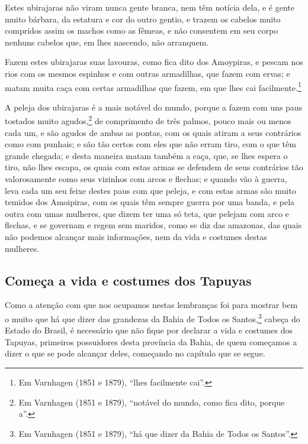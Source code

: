 Estes ubirajaras não viram nunca gente branca, nem têm notícia dela, e é gente muito
bárbara, da estatura e cor do outro gentio, e trazem os cabelos muito compridos assim os
machos como as fêmeas, e não consentem em seu corpo nenhuns cabelos que, em lhes nascendo,
não arranquem.

Fazem estes ubirajaras suas lavouras, como fica dito dos Amoypiras, e pescam nos rios com
os mesmos espinhos e com outras armadilhas, que fazem com ervas; e matam muita caça com
certas armadilhas que fazem, em que lhes cai facilmente.\footnote{ Em Varnhagen (1851 e
1879), ``lhes facilmente cai''.}

A peleja dos ubirajaras é a mais notável do mundo, porque a fazem com uns paus tostados
muito agudos,\footnote{ Em Varnhagen (1851 e 1879), ``notável do mundo, como fica dito,
porque a''.} de comprimento de três palmos, pouco mais ou menos cada um, e são agudos de
ambas as pontas, com os quais atiram a seus contrários como com punhais; e são tão certos
com eles que não erram tiro, com o que têm grande chegada; e desta maneira matam também a
caça, que, se lhes espera o tiro, não lhes escapa, os quais com estas armas se defendem de
seus contrários tão valorosamente como seus vizinhos com arcos e flechas; e quando vão à
guerra, leva cada um seu feixe destes paus com que peleja, e com estas armas são muito
temidos dos Amoipiras, com os quais têm sempre guerra por uma banda, e pela outra com umas
mulheres, que dizem ter uma só teta, que pelejam com arco e flechas, e se governam e regem
sem maridos, como se diz das amazonas, das quais não podemos alcançar mais informações,
nem da vida e costumes destas mulheres.

\subsection{Começa a vida e costumes dos Tapuyas}

Como a atenção com que nos ocupamos nestas lembranças foi para mostrar bem o muito que há
que dizer das grandezas da Bahia de Todos os Santos,\footnote{ Em Varnhagen (1851 e 1879),
``há que dizer da Bahia de Todos os Santos''.} cabeça do Estado do Brasil, é necessário
que não fique por declarar a vida e costumes dos Tapuyas, primeiros possuidores desta
província da Bahia, de quem começamos a dizer o que se pode alcançar deles, começando no
capítulo que se segue.

